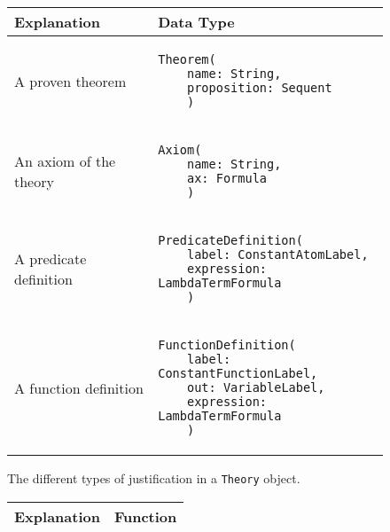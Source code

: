  {
    \def\arraystretch{4}

    \begin{figure}[hp]
      \begin{center}
        \begin{tabular}{l|l}
          Explanation            & Data Type
          \\ \hline

          A proven theorem       &
          \begin{lstlisting}[linewidth=19.5em]
  Theorem(
    name: String,
    proposition: Sequent
    )

          \end{lstlisting}
          \\ %

          An axiom of the theory &
          \begin{lstlisting}[linewidth=19.5em]
  Axiom(
    name: String,
    ax: Formula
    )

          \end{lstlisting}
          \\ %

          A predicate definition &
          \begin{lstlisting}[linewidth=19.5em]
  PredicateDefinition(
    label: ConstantAtomLabel,
    expression: LambdaTermFormula
    )

          \end{lstlisting}
          \\ %

          A function definition  &
          \begin{lstlisting}[linewidth=19.5em]
  FunctionDefinition(
    label: ConstantFunctionLabel,
    out: VariableLabel,
    expression: LambdaTermFormula
    )

          \end{lstlisting}
          \\ %
        \end{tabular}

        \caption{The different types of justification in a \lstinline|Theory|{} object.}
        \label{fig:justifications}
      \end{center}
    \end{figure}

    \begin{figure}[hp]
      \begin{center}
        \begin{tabular}{l|l}
          Explanation & Function
          \\ \hline


\end{tabular}
\end{center}
\end{figure}}
